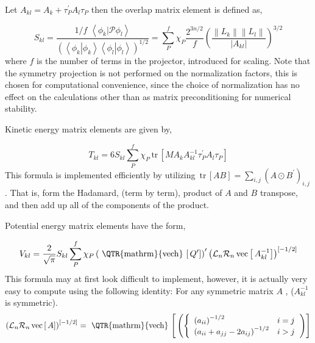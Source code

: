\documentclass[12pt,thmsa]{article}
\begin{document}
Let $A_{kl}=A_k+\tau _P^{\prime }A_l\tau _P$ then the overlap matrix element
is defined as,

\begin{equation}
S_{kl}=\frac{1/f\,\,\left\langle \phi _k\right. |\left. \mathcal{P}\phi
_l\right\rangle }{\left( \left\langle \phi _k\right. |\left. \phi
_k\right\rangle \left\langle \phi _l\right. |\left. \phi _l\right\rangle
\right) ^{1/2}}=\sum_P^f\chi _P\frac{2^{3n/2}}f\left( \frac{\left\|
L_k\right\| \left\| L_l\right\| }{\left| A_{kl}\right| }\right) ^{3/2}
\label{skl}
\end{equation}
where $f$ is the number of terms in the projector, introduced for scaling.
Note that the symmetry projection is not performed on the normalization
factors, this is chosen for computational convenience, since the choice of
normalization has no effect on the calculations other than as matrix
preconditioning for numerical stability.

Kinetic energy matrix elements are given by,

\begin{equation}
T_{kl}=6S_{kl}\sum_P^f\chi _P\,\mathrm{tr}\,\left[ MA_kA_{kl}^{-1}\tau
_P^{\prime }A_l\tau _P\right]  \label{Tkl}
\end{equation}
This formula is implemented efficiently by utilizing $\,\mathrm{tr}\,\left[
AB\right] =\sum_{i,j}\left( A\odot B^{\prime }\right) _{i,j}$. That is, form
the Hadamard, (term by term), product of $A$ and $B$ transpose, and then add
up all of the components of the product.

Potential energy matrix elements have the form,

\begin{equation}
V_{kl}=\frac 2{\sqrt{\pi }}S_{kl}\sum_P^f\chi _P\left( \,\mathrm{\,%
\QTR{mathrm}{vech}\,}\left[ \,Q^{\prime }\right] \right) ^{\prime }\left( 
\mathcal{L}_n\mathcal{R}_n\,\mathrm{vec}\left[ \,A_{kl}^{-1}\right] \right)
^{\left[ -1/2\right] }  \label{Vkl}
\end{equation}
This formula may at first look difficult to implement, however, it is
actually very easy to compute using the following identity: For any
symmetric matrix $A$ , ($A_{kl}^{-1}$ is symmetric). 
\begin{equation}
\left( \mathcal{L}_n\mathcal{R}_n\,\mathrm{vec}\left[ \,A\right] \right)
^{\left[ -1/2\right] }=\,\mathrm{\,\QTR{mathrm}{vech}\,}\left[ \,\left(
\left\{ 
\begin{array}{ll}
\left( a_{ii}\right) ^{-1/2} & i=j \\ 
\left( a_{ii}+a_{jj}-2a_{ij}\right) ^{-1/2} & i>j
\end{array}
\right. \right) \right]
\end{equation}
\end{document}

